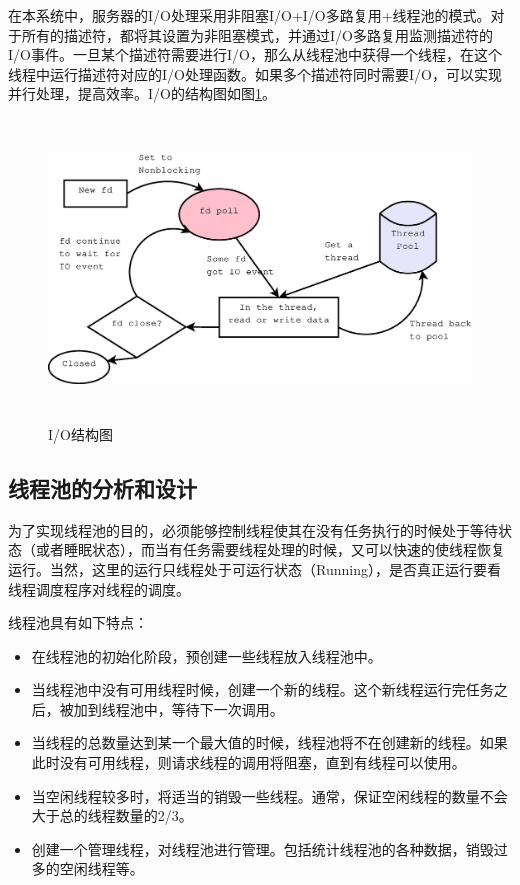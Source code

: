 \documentclass[12pt, twoside, a4paper, xetex]{report}
\begin{document}
	在本系统中，服务器的I/O处理采用非阻塞I/O+I/O多路复用+线程池的模式。对于所有的描述符，都将其设置为非阻塞模式，并通过I/O多路复用监测描述符的I/O事件。一旦某个描述符需要进行I/O，那么从线程池中获得一个线程，在这个线程中运行描述符对应的I/O处理函数。如果多个描述符同时需要I/O，可以实现并行处理，提高效率。I/O的结构图如图\ref{IO}。
	
	\begin{figure}[htbp]
	\centering
	\caption{I/O结构图}
	\label{IO}
	\includegraphics[height=8cm, width=15cm]{pics/IO.eps}
	\end{figure}
	
\subsection{线程池的分析和设计}
	为了实现线程池的目的，必须能够控制线程使其在没有任务执行的时候处于等待状态（或者睡眠状态），而当有任务需要线程处理的时候，又可以快速的使线程恢复运行。当然，这里的运行只线程处于可运行状态（Running），是否真正运行要看线程调度程序对线程的调度。
	
	线程池具有如下特点：
	\begin{itemize}
		\item 在线程池的初始化阶段，预创建一些线程放入线程池中。
		\item 当线程池中没有可用线程时候，创建一个新的线程。这个新线程运行完任务之后，被加到线程池中，等待下一次调用。
		\item 当线程的总数量达到某一个最大值的时候，线程池将不在创建新的线程。如果此时没有可用线程，则请求线程的调用将阻塞，直到有线程可以使用。
		\item 当空闲线程较多时，将适当的销毁一些线程。通常，保证空闲线程的数量不会大于总的线程数量的2/3。
		\item 创建一个管理线程，对线程池进行管理。包括统计线程池的各种数据，销毁过多的空闲线程等。
	\end{itemize}
	
\end{document}
